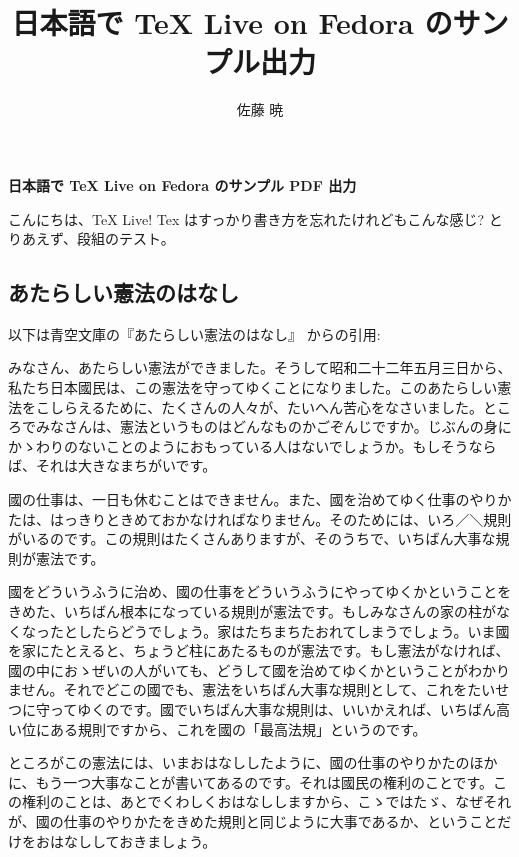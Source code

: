 \documentclass{article}
\title{日本語で TeX Live on Fedora のサンプル出力}
\author{佐藤 暁}
\begin{document}


\begin{center}
{\textbf{\large 日本語で TeX Live on Fedora のサンプル PDF 出力}}
\end{center}


こんにちは、TeX Live! Tex はすっかり書き方を忘れたけれどもこんな感じ? とりあえず、段組のテスト。


\begin{multicols}{2}

\section{あたらしい憲法のはなし}

以下は青空文庫の『あたらしい憲法のはなし』 からの引用:

みなさん、あたらしい憲法ができました。そうして昭和二十二年五月三日から、私たち日本國民は、この憲法を守ってゆくことになりました。このあたらしい憲法をこしらえるために、たくさんの人々が、たいへん苦心をなさいました。ところでみなさんは、憲法というものはどんなものかごぞんじですか。じぶんの身にかゝわりのないことのようにおもっている人はないでしょうか。もしそうならば、それは大きなまちがいです。


國の仕事は、一日も休むことはできません。また、國を治めてゆく仕事のやりかたは、はっきりときめておかなければなりません。そのためには、いろ／＼規則がいるのです。この規則はたくさんありますが、そのうちで、いちばん大事な規則が憲法です。


國をどういうふうに治め、國の仕事をどういうふうにやってゆくかということをきめた、いちばん根本になっている規則が憲法です。もしみなさんの家の柱がなくなったとしたらどうでしょう。家はたちまちたおれてしまうでしょう。いま國を家にたとえると、ちょうど柱にあたるものが憲法です。もし憲法がなければ、國の中におゝぜいの人がいても、どうして國を治めてゆくかということがわかりません。それでどこの國でも、憲法をいちばん大事な規則として、これをたいせつに守ってゆくのです。國でいちばん大事な規則は、いいかえれば、いちばん高い位にある規則ですから、これを國の「最高法規」というのです。


ところがこの憲法には、いまおはなししたように、國の仕事のやりかたのほかに、もう一つ大事なことが書いてあるのです。それは國民の権利のことです。この権利のことは、あとでくわしくおはなししますから、こゝではたゞ、なぜそれが、國の仕事のやりかたをきめた規則と同じように大事であるか、ということだけをおはなししておきましょう。



\end{multicols}
\end{document}
